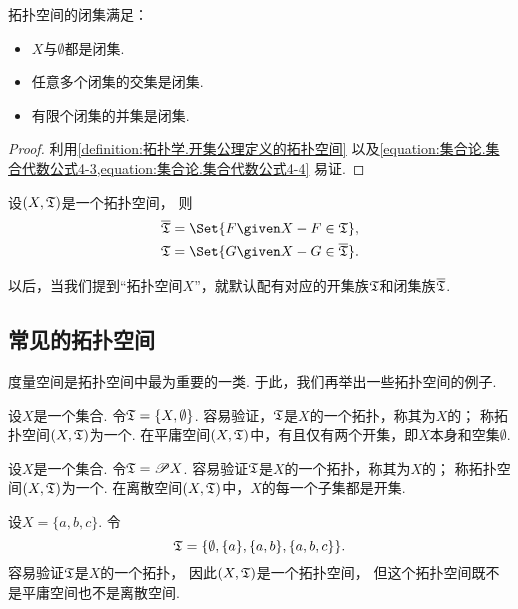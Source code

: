 \begin{property}
拓扑空间的闭集满足：\begin{itemize}
	\item \(X\)与\(\emptyset\)都是闭集.
	\item 任意多个闭集的交集是闭集.
	\item 有限个闭集的并集是闭集.
\end{itemize}
\begin{proof}
利用\cref{definition:拓扑学.开集公理定义的拓扑空间}
以及\cref{equation:集合论.集合代数公式4-3,equation:集合论.集合代数公式4-4}
易证.
\end{proof}
\end{property}

\begin{theorem}
设\((X,{\mathfrak T})\)是一个拓扑空间，
则\begin{gather*}
	\oT = \Set{ F \given X-F \in \T }, \\
	\T = \Set{ G \given X-G \in \oT }.
\end{gather*}
\end{theorem}
以后，当我们提到“拓扑空间\(X\)”，就默认配有对应的开集族\({\mathfrak T}\)和闭集族\(\overline{{\mathfrak T}}\).

\subsection{常见的拓扑空间}
度量空间是拓扑空间中最为重要的一类.
于此，我们再举出一些拓扑空间的例子.

\begin{example}[平庸空间]
设\(X\)是一个集合.
令\({\mathfrak T}=\{X,\emptyset\}\).
容易验证，\({\mathfrak T}\)是\(X\)的一个拓扑，称其为\(X\)的；
称拓扑空间\((X,{\mathfrak T})\)为一个.
在平庸空间\((X,{\mathfrak T})\)中，有且仅有两个开集，即\(X\)本身和空集\(\emptyset\).
\end{example}

\begin{example}[离散空间]
设\(X\)是一个集合.
令\({\mathfrak T}=\mathscr{P} X\).
容易验证\({\mathfrak T}\)是\(X\)的一个拓扑，称其为\(X\)的；
称拓扑空间\((X,{\mathfrak T})\)为一个.
在离散空间\((X,{\mathfrak T})\)中，\(X\)的每一个子集都是开集.
\end{example}

\begin{example}\label{example:拓扑学.常见的拓扑空间3}
设\(X = \{a,b,c\}\).
令\begin{equation*}
	{\mathfrak T} = \{
		\emptyset,
		\{a\},
		\{a,b\},
		\{a,b,c\}
	\}.
\end{equation*}
容易验证\({\mathfrak T}\)是\(X\)的一个拓扑，
因此\((X,{\mathfrak T})\)是一个拓扑空间，
但这个拓扑空间既不是平庸空间也不是离散空间.
\end{example}


